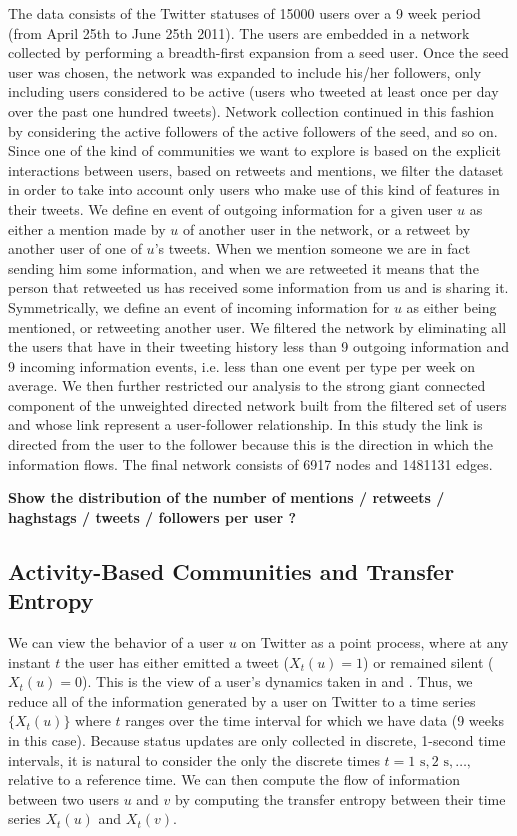 The data consists of the Twitter statuses of 15000 users over a 9 week period (from April 25th to June 25th 2011). The users are embedded in a network collected by performing a breadth-first expansion from a seed user. Once the seed user was chosen, the network was expanded to include his/her followers, only including users considered to be active (users who tweeted at least once per day over the past one hundred tweets). Network collection continued in this fashion by considering the active followers of the active followers of the seed, and so on.
Since one of the kind of communities we want to explore is based on the explicit interactions between users, based on retweets and mentions, we filter the dataset in order to take into account only users who make use of this kind of features in their tweets. We define en event of outgoing information for a given user $u$ as either a mention made by $u$ of another user in the network, or a retweet by another user of one of $u$'s tweets. When we mention someone we are in fact sending him some information, and when we are retweeted it means that the person that retweeted us has received some information from us and is sharing it. Symmetrically, we define an event of incoming information for $u$ as either being mentioned, or retweeting another user. We filtered the network by eliminating all the users that have in their tweeting history less than 9 outgoing information and 9 incoming information events, i.e. less than one event per type per week on average. We then further restricted our analysis to the strong giant connected component of the unweighted directed network built from the filtered set of users and whose link represent a user-follower relationship. In this study the link is directed from the user to the follower because this is the direction in which the information flows. The final network consists of 6917 nodes and 1481131 edges.

\textbf{Show the distribution of the number of mentions / retweets / haghstags / tweets / followers per user ?}

\subsection{Activity-Based Communities and Transfer Entropy}

\label{method-activity}

We can view the behavior of a user $u$ on Twitter as a point process, where at any instant $t$ the user has either emitted a tweet ($X_{t}(u) = 1$) or remained silent ($X_{t}(u) = 0$). This is the view of a user's dynamics taken in \cite{ver2012information} and \cite{darmon2013understanding}. Thus, we reduce all of the information generated by a user on Twitter to a time series $\{ X_{t}(u)\}$ where $t$ ranges over the time interval for which we have data (9 weeks in this case). Because status updates are only collected in discrete, 1-second time intervals, it is natural to consider the only the discrete times $t = 1 \text{ s}, 2 \text{ s}, \ldots, $ relative to a reference time. We can then compute the flow of information between two users $u$ and $v$ by computing the transfer entropy between their time series $X_{t}(u)$ and $X_{t}(v).$

